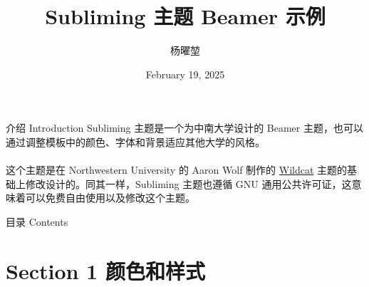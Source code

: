 \documentclass[aspectratio=1610,fontset=none]{ctexbeamer}
\title{Subliming 主题 Beamer 示例}
\author{杨曜堃}
\date{February 19, 2025}
\begin{document}
    \begin{frame}
        \titlepage
    \end{frame}

    \begin{frame}{介绍 Introduction}
        Subliming 主题是一个为中南大学设计的 Beamer 主题，也可以通过调整模板中的颜色、字体和背景适应其他大学的风格。 
        \\ ~ \\
        这个主题是在 Northwestern University 的 Aaron Wolf 制作的 \href{https://github.com/aarondwolf/wildcatwildcat}{Wildcat} 主题的基础上修改设计的。同其一样，Subliming 主题也遵循 GNU 通用公共许可证，这意味着可以免费自由使用以及修改这个主题。
    \end{frame}

    \begin{frame}{目录 Contents}
        \tableofcontents
    \end{frame}

    \section{Section 1 颜色和样式}
\end{document}
